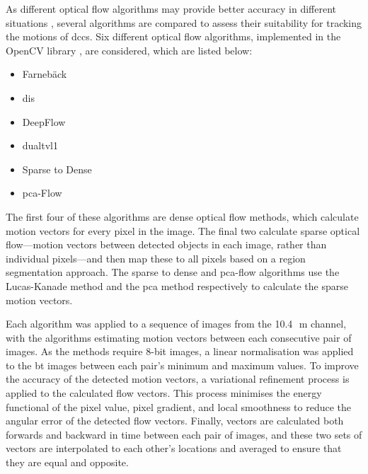 As different optical flow algorithms may provide better accuracy in different situations \citep{baker_database_2011}, several algorithms are compared to assess their suitability for tracking the motions of \acrshort{dcc}s.
Six different optical flow algorithms, implemented in the OpenCV library \citep{opencv_library}, are considered, which are listed below:

\begin{itemize}
    \item Farnebäck \citep{farneback_two-frame_2003}
    \item \acrfull{dis} \citep{kroeger_fast_2016}
    \item DeepFlow \citep{weinzaepfel_deepflow_2013}
    \item \acrfull{dualtvl1} \citep{zach_duality_2007, perez_tv-l1_2013}
    \item Sparse to Dense \citep{bouguet_pyramidal_1999}
    \item \acrfull{pca}-Flow \citep{wulff_efficient_2015}
\end{itemize}

The first four of these algorithms are dense optical flow methods, which calculate motion vectors for every pixel in the image.
The final two calculate sparse optical flow---motion vectors between detected objects in each image, rather than individual pixels---and then map these to all pixels based on a region segmentation approach.
The sparse to dense and \acrshort{pca}-flow algorithms use the Lucas-Kanade method \citep{lucas_iterative_1981} and the \acrshort{pca} method respectively to calculate the sparse motion vectors.

Each algorithm was applied to a sequence of images from the 10.4\,\unit{\mu m} channel, with the algorithms estimating motion vectors between each consecutive pair of images.
As the methods require 8-bit images, a linear normalisation was applied to the \acrshort{bt} images between each pair's minimum and maximum values.
To improve the accuracy of the detected motion vectors, a variational refinement process \citep{brox_high_2004} is applied to the calculated flow vectors.
This process minimises the energy functional of the pixel value, pixel gradient, and local smoothness to reduce the angular error of the detected flow vectors.
Finally, vectors are calculated both forwards and backward in time between each pair of images, and these two sets of vectors are interpolated to each other's locations and averaged to ensure that they are equal and opposite.

